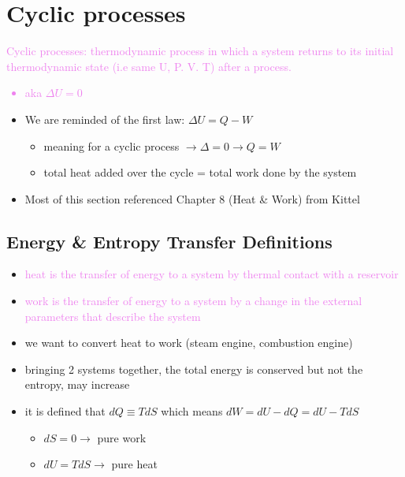 
\section{Cyclic processes}


\textcolor{violet}{Cyclic processes: thermodynamic process in which a system returns to its initial
	thermodynamic state (i.e same U, P. V. T) after a process.
	\begin{itemize}
		\item aka $\Delta U = 0$
	\end{itemize}
}

\begin{itemize}
	\item We are reminded of the first law: $\Delta U = Q - W$
	      \begin{itemize}
		      \item meaning for a cyclic process  $\rightarrow \Delta = 0 \rightarrow Q = W$
		      \item total heat added over the cycle = total work done by the system
	      \end{itemize}
	\item Most of this section referenced Chapter 8 (Heat \& Work) from Kittel
\end{itemize}


\subsection*{Energy \& Entropy Transfer Definitions}
\begin{itemize}
	\item \textcolor{violet}{heat is the transfer of energy to a system by thermal contact
		      with a reservoir}
	\item \textcolor{violet}{work is the transfer of energy to a system by a change in the
		      external parameters that describe the system}
	\item we want to convert heat to work (steam engine, combustion engine)
	\item bringing 2 systems together, the total energy is conserved but not the entropy,
	      may increase
	\item it is defined that $dQ \equiv T dS$ which means $dW = dU - dQ = dU - TdS$
	      \begin{itemize}
		      \item $dS = 0 \rightarrow$ pure work
		      \item $dU = TdS \rightarrow$ pure heat
	      \end{itemize}
\end{itemize}

